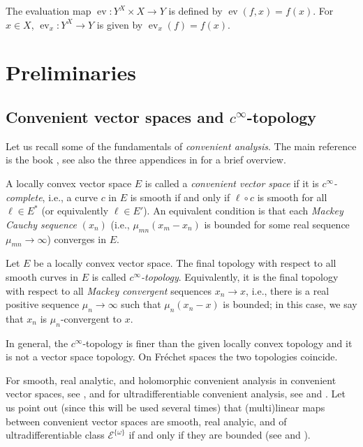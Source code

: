 \documentclass[10pt, reqno]{amsart}
\theoremstyle{plain}
\theoremstyle{definition}
\numberwithin{equation}{section}
\def\om{\omega}
\def\cE{\mathcal{E}}
\renewcommand{\o}{\circ}
\let\on=\operatorname
\def\ev{\on{ev}}
\begin{document}
The evaluation map $\ev : Y^X \times X \to Y$ is defined by $\ev(f,x) = f(x)$. For $x \in X$, $\ev_x : Y^X \to Y$ 
is given by $\ev_x(f) = f(x)$.

\section{Preliminaries} \label{sec:pre}


\subsection{Convenient vector spaces and \texorpdfstring{$c^\infty$}{c infty}-topology} \label{ssec:convenient}

Let us recall some of the fundamentals of \emph{convenient analysis}. The main reference is the book \cite{KM97}, 
see also the three appendices in \cite{KMRc} for a brief overview.

A locally convex vector space $E$ is called a \emph{convenient vector space} if it is \emph{$c^\infty$-complete}, i.e.,
a curve $c$ in $E$ is smooth if and only if $\ell \o c$ is smooth for all $\ell \in E^*$ (or equivalently $\ell \in E'$).
An equivalent condition is that each \emph{Mackey Cauchy sequence} $(x_n)$ (i.e., $\mu_{mn}(x_m-x_n)$ is bounded for some 
real sequence $\mu_{mn} \to \infty$)
converges in $E$.


Let $E$ be a locally convex vector space. The final topology with respect to all smooth curves in $E$ is called 
\emph{$c^\infty$-topology}. Equivalently, it is the final topology with respect to all \emph{Mackey convergent} 
sequences $x_n \to x$, i.e., there is a real positive sequence $\mu_n \to \infty$ such that 
$\mu_n (x_n-x)$ is bounded; in this case, we say that $x_n$ is $\mu_n$-convergent to $x$. 

In general, the $c^\infty$-topology is finer than the given locally convex topology and it is not a vector space topology.
On Fr\'echet spaces the two topologies coincide.

For smooth, real analytic, and holomorphic convenient analysis in convenient vector spaces, see \cite{KM97}, 
and for ultradifferentiable convenient analysis, see \cite{KMRc,KMRq,KMRu} and \cite{Schindl14a}. 
Let us point out (since this will be used several times) 
that (multi)linear maps between convenient vector spaces are smooth, real analyic, and of ultradifferentiable 
class $\cE^{\{\om\}}$ if and only if they are bounded (see \cite[5.5 and 11.13]{KM97} and \cite[Proposition 8.3]{KMRu}).
\end{document}
